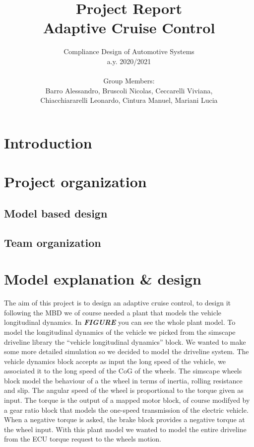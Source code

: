 \documentclass[12pt,a4paper]{report}
\begin{document}
	
	\author{Compliance Design of Automotive Systems \\
		a.y. 2020/2021\\\\
		Group Members:\\
		Barro Alessandro, Bruscoli Nicolas, Ceccarelli Viviana, \\
		Chiacchiararelli Leonardo, Cintura Manuel, Mariani Lucia\\
	}
	\title{Project Report\\
		Adaptive Cruise Control
	}
	\maketitle
	
\tableofcontents
\listoffigures

\chapter{Introduction}

\chapter{Project organization}

\section{Model based design}
\section{Team organization}


\chapter{Model explanation \& design}
The aim of this project is to design an adaptive cruise control, to design it following the MBD we of course needed a plant that models the vehicle longitudinal dynamics.
In \textbf{\textit{FIGURE}} you can see the whole plant model.
To model the longitudinal dynamics of the vehicle we picked from the simscape driveline library the “vehicle longitudinal dynamics” block.
We wanted to make some more detailed simulation so we decided to model the driveline system.
The vehicle dynamics block accepts as input the long speed of the vehicle, we associated it to the long speed of the CoG of the wheels.
The simscape wheels block model the behaviour of a the wheel in terms of inertia, rolling resistance and slip. The angular speed of the wheel is proportional to the torque given as input.
The torque is the output of a mapped motor block, of course modifyed by a gear ratio block that models the one-speed transmission of the electric vehicle.
When a negative torque is asked, the brake block provides a negative torque at the wheel input.
With this plant model we wanted to model the entire driveline from the ECU torque request to the wheels motion.
\end{document}
